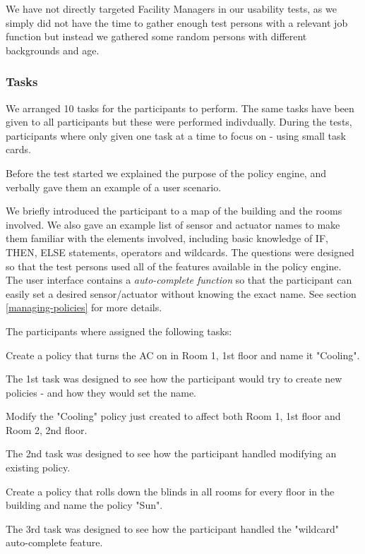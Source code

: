We have not directly targeted Facility Managers in our usability tests, as we simply did not have the time to gather enough test persons with a relevant job function but instead we gathered some random persons with different backgrounds and age.

\subsubsection{Tasks}
We arranged 10 tasks for the participants to perform. The same tasks have been given to all participants but these were performed indivdually.
During the tests, participants where only given one task at a time to focus on - using small task cards.

Before the test started we explained the purpose of the policy engine, and verbally gave them an example of a user scenario.

We briefly introduced the participant to a map of the building and the rooms involved. We also gave an example list of sensor and actuator names to make them familiar with the elements involved, including basic knowledge of IF, THEN, ELSE statements, operators and wildcards. The questions were designed so that the test persons used all of the features available in the policy engine. The user interface contains a \textit{auto-complete function} so that the participant can easily set a desired sensor/actuator without knowing the exact name. See section \ref{managing-policies} for more details.

The participants where assigned the following tasks:

\begin{framed}
Create a policy that turns the AC on in Room 1, 1st floor and name it "Cooling".
\end{framed}
The 1st task was designed to see how the participant would try to create new policies - and how they would set the name.

\begin{framed}
Modify the "Cooling" policy just created to affect both Room 1, 1st floor and Room 2, 2nd floor.
\end{framed}
The 2nd task was designed to see how the participant handled modifying an existing policy.

\begin{framed}
Create a policy that rolls down the blinds in all rooms for every floor in the building and name the policy "Sun".
\end{framed}
The 3rd task was designed to see how the participant handled the "wildcard" auto-complete feature.

